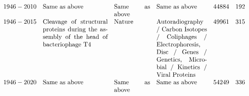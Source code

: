 \begin{table}[t]
\begin{center}
{\[\begin{array}{cp{36mm}p{20mm}p{28mm}rr}
{1946-2010} & {Same as above} & {Same as above} & {Same as above} & 44884 & 192 \\
{1946-2015} & {Cleavage of structural proteins during the assembly of the head of bacteriophage T4} & {Nature} & {Autoradiography} / {Carbon Isotopes} / {Coliphages} / {Electrophoresis, Disc} / {Genes} / {Genetics, Microbial} / {Kinetics} / {Viral Proteins} & 49961 & 315 \\
{1946-2020} & {Same as above} & {Same as above} & {Same as above} & 54249 & 336 \\
\end{array}
\]
}
\end{center}
\end{table}

